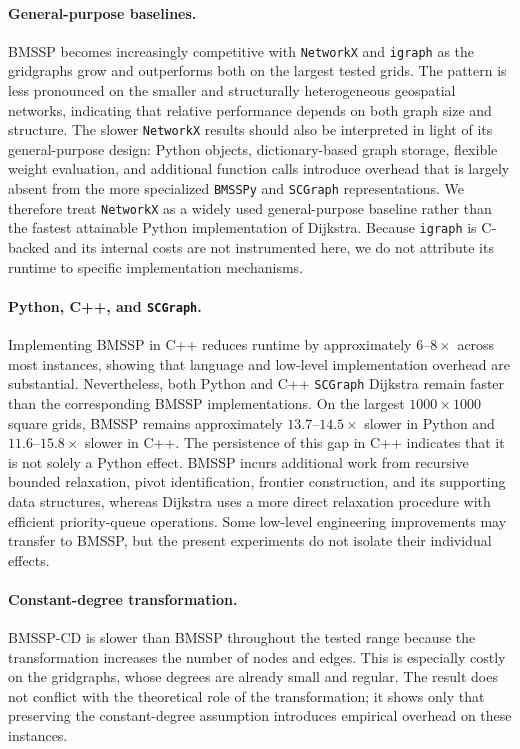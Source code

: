 \documentclass[ijoc,blindrev]{informs3} %
\begin{document}
\begin{APPENDICES}
{\paragraph{General-purpose baselines.} BMSSP becomes increasingly competitive with \texttt{NetworkX} and \texttt{igraph} as the gridgraphs grow and outperforms both on the largest tested grids. The pattern is less pronounced on the smaller and structurally heterogeneous geospatial networks, indicating that relative performance depends on both graph size and structure. The slower \texttt{NetworkX} results should also be interpreted in light of its general-purpose design: Python objects, dictionary-based graph storage, flexible weight evaluation, and additional function calls introduce overhead that is largely absent from the more specialized \texttt{BMSSPy} and \texttt{SCGraph} representations. We therefore treat \texttt{NetworkX} as a widely used general-purpose baseline rather than the fastest attainable Python implementation of Dijkstra. Because \texttt{igraph} is C-backed and its internal costs are not instrumented here, we do not attribute its runtime to specific implementation mechanisms.

\paragraph{Python, C++, and \texttt{SCGraph}.} Implementing BMSSP in C++ reduces runtime by approximately \(6\)--\(8\times\) across most instances, showing that language and low-level implementation overhead are substantial. Nevertheless, both Python and C++ \texttt{SCGraph} Dijkstra remain faster than the corresponding BMSSP implementations. On the largest \(1000\times1000\) square grids, BMSSP remains approximately \(13.7\)--\(14.5\times\) slower in Python and \(11.6\)--\(15.8\times\) slower in C++. The persistence of this gap in C++ indicates that it is not solely a Python effect. BMSSP incurs additional work from recursive bounded relaxation, pivot identification, frontier construction, and its supporting data structures, whereas Dijkstra uses a more direct relaxation procedure with efficient priority-queue operations. Some low-level engineering improvements may transfer to BMSSP, but the present experiments do not isolate their individual effects.

\paragraph{Constant-degree transformation.} BMSSP-CD is slower than BMSSP throughout the tested range because the transformation increases the number of nodes and edges. This is especially costly on the gridgraphs, whose degrees are already small and regular. The result does not conflict with the theoretical role of the transformation; it shows only that preserving the constant-degree assumption introduces empirical overhead on these instances.

}
\end{APPENDICES}
\end{document}
